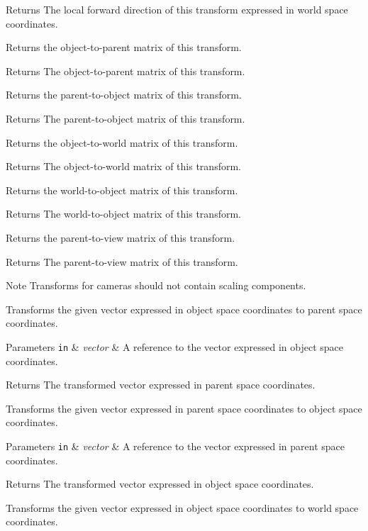 \begin{DoxyReturn}{Returns}
The local forward direction of this transform expressed in world space coordinates.
\end{DoxyReturn}
Returns the object-\/to-\/parent matrix of this transform.

\begin{DoxyReturn}{Returns}
The object-\/to-\/parent matrix of this transform.
\end{DoxyReturn}
Returns the parent-\/to-\/object matrix of this transform.

\begin{DoxyReturn}{Returns}
The parent-\/to-\/object matrix of this transform.
\end{DoxyReturn}
Returns the object-\/to-\/world matrix of this transform.

\begin{DoxyReturn}{Returns}
The object-\/to-\/world matrix of this transform.
\end{DoxyReturn}
Returns the world-\/to-\/object matrix of this transform.

\begin{DoxyReturn}{Returns}
The world-\/to-\/object matrix of this transform.
\end{DoxyReturn}
Returns the parent-\/to-\/view matrix of this transform.

\begin{DoxyReturn}{Returns}
The parent-\/to-\/view matrix of this transform. 
\end{DoxyReturn}
\begin{DoxyNote}{Note}
Transforms for cameras should not contain scaling components.
\end{DoxyNote}
Transforms the given vector expressed in object space coordinates to parent space coordinates.


\begin{DoxyParams}[1]{Parameters}
\mbox{\tt in}  & {\em vector} & A reference to the vector expressed in object space coordinates. \\
\hline
\end{DoxyParams}
\begin{DoxyReturn}{Returns}
The transformed vector expressed in parent space coordinates.
\end{DoxyReturn}
Transforms the given vector expressed in parent space coordinates to object space coordinates.


\begin{DoxyParams}[1]{Parameters}
\mbox{\tt in}  & {\em vector} & A reference to the vector expressed in parent space coordinates. \\
\hline
\end{DoxyParams}
\begin{DoxyReturn}{Returns}
The transformed vector expressed in object space coordinates.
\end{DoxyReturn}
Transforms the given vector expressed in object space coordinates to world space coordinates.



